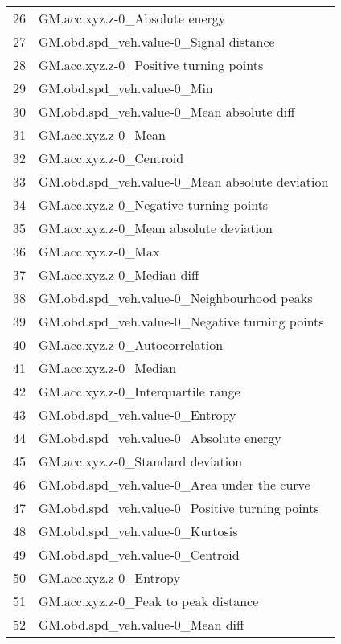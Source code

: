 \begin{tabular}{ll}
26 &                    GM.acc.xyz.z-0\_Absolute energy \\
27 &            GM.obd.spd\_veh.value-0\_Signal distance \\
28 &            GM.acc.xyz.z-0\_Positive turning points \\
29 &                        GM.obd.spd\_veh.value-0\_Min \\
30 &         GM.obd.spd\_veh.value-0\_Mean absolute diff \\
31 &                               GM.acc.xyz.z-0\_Mean \\
32 &                           GM.acc.xyz.z-0\_Centroid \\
33 &    GM.obd.spd\_veh.value-0\_Mean absolute deviation \\
34 &            GM.acc.xyz.z-0\_Negative turning points \\
35 &            GM.acc.xyz.z-0\_Mean absolute deviation \\
36 &                                GM.acc.xyz.z-0\_Max \\
37 &                        GM.acc.xyz.z-0\_Median diff \\
38 &        GM.obd.spd\_veh.value-0\_Neighbourhood peaks \\
39 &    GM.obd.spd\_veh.value-0\_Negative turning points \\
40 &                    GM.acc.xyz.z-0\_Autocorrelation \\
41 &                             GM.acc.xyz.z-0\_Median \\
42 &                GM.acc.xyz.z-0\_Interquartile range \\
43 &                    GM.obd.spd\_veh.value-0\_Entropy \\
44 &            GM.obd.spd\_veh.value-0\_Absolute energy \\
45 &                 GM.acc.xyz.z-0\_Standard deviation \\
46 &       GM.obd.spd\_veh.value-0\_Area under the curve \\
47 &    GM.obd.spd\_veh.value-0\_Positive turning points \\
48 &                   GM.obd.spd\_veh.value-0\_Kurtosis \\
49 &                   GM.obd.spd\_veh.value-0\_Centroid \\
50 &                            GM.acc.xyz.z-0\_Entropy \\
51 &              GM.acc.xyz.z-0\_Peak to peak distance \\
52 &                  GM.obd.spd\_veh.value-0\_Mean diff \\

\end{tabular}
